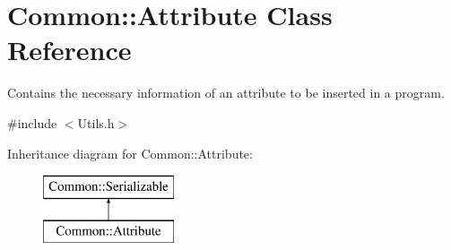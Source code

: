 \hypertarget{class_common_1_1_attribute}{\section{Common\-:\-:Attribute Class Reference}
\label{class_common_1_1_attribute}
}


Contains the necessary information of an attribute to be inserted in a program.  




{\ttfamily \#include $<$Utils.\-h$>$}

Inheritance diagram for Common\-:\-:Attribute\-:\begin{figure}[H]
\begin{center}
\leavevmode
\includegraphics[height=2.000000cm]{class_common_1_1_attribute}
\end{center}
\end{figure}
